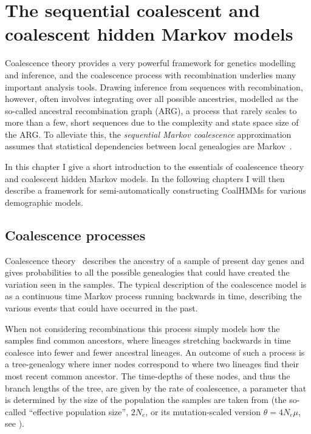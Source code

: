 \chapter{The sequential coalescent and coalescent hidden Markov models}
\label{chap:smc-coalhmm}

Coalescence theory provides a very powerful framework for genetics modelling and inference, and the coalescence process with recombination underlies many important analysis tools. Drawing inference from sequences with recombination, however, often involves integrating over all possible ancestries, modelled as the so-called ancestral recombination graph (ARG), a process that rarely scales to more than a few, short sequences due to the complexity and state space size of the ARG. To alleviate this, the \emph{sequential Markov coalescence} approximation assumes that statistical dependencies between local genealogies are Markov~\cite{McVean:2005ho, Marjoram:2006hp,Hobolth:2014cw}.

In this chapter I give a short introduction to the essentials of coalescence theory and coalescent hidden Markov models. In the following chapters I will then describe a framework for semi-automatically constructing CoalHMMs for various demographic models.

\section{Coalescence processes}

Coalescence theory~\cite{Hein:2005vz} describes the ancestry of a sample of present day genes and gives probabilities to all the possible genealogies that could have created the variation seen in the samples. The typical description of the coalescence model is as a continuous time Markov process running backwards in time, describing the various events that could have occurred in the past.

When not considering recombinations this process simply models how the samples find common ancestors, where lineages stretching backwards in time coalesce into fewer and fewer ancestral lineages.  An outcome of such a process is a tree-genealogy where inner nodes correspond to where two lineages find their most recent common ancestor. The time-depths of these nodes, and thus the branch lengths of the tree, are given by the rate of coalescence, a parameter that is determined by the size of the population the samples are taken from (the so-called ``effective population size'', $2N_e$, or its mutation-scaled version $\theta=4 N_e \mu$, see \citet{Hein:2005vz}).

